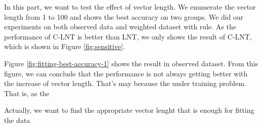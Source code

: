 In this part, we want to test the effect of vector length. We enumerate the vector length from 1 to 100 and shows the best accuracy on two groups. We did our experiments on both observed data and weighted dataset with rule. As the performance of C-LNT is better than LNT, we only shows the result of C-LNT, which is shown in Figure \ref{fig:sensitive}.

Figure \ref{fig:fitting-best-accuracy-1} shows the result in observed dataset.
From this figure, we can conclude that the performance is not always getting better with the increase of vector length. That's may because the under training problem. That is, as the 

Actually, we want to find the appropriate vector lenght that is enough for fitting the data
